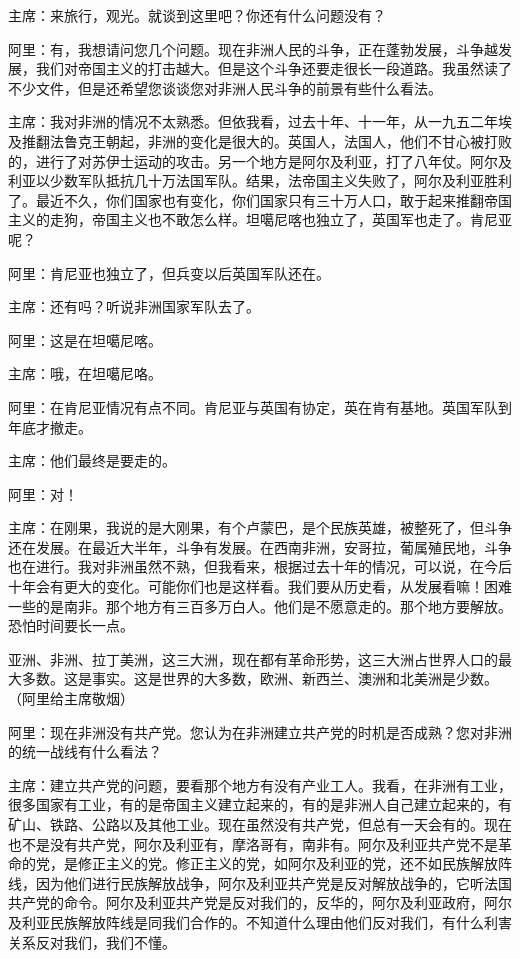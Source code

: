 主席：来旅行，观光。就谈到这里吧？你还有什么问题没有？

阿里：有，我想请问您几个问题。现在非洲人民的斗争，正在蓬勃发展，斗争越发展，我们对帝国主义的打击越大。但是这个斗争还要走很长一段道路。我虽然读了不少文件，但是还希望您谈谈您对非洲人民斗争的前景有些什么看法。

主席：我对非洲的情况不太熟悉。但依我看，过去十年、十一年，从一九五二年埃及推翻法鲁克王朝起，非洲的变化是很大的。英国人，法国人，他们不甘心被打败的，进行了对苏伊士运动的攻击。另一个地方是阿尔及利亚，打了八年仗。阿尔及利亚以少数军队抵抗几十万法国军队。结果，法帝国主义失败了，阿尔及利亚胜利了。最近不久，你们国家也有变化，你们国家只有三十万人口，敢于起来推翻帝国主义的走狗，帝国主义也不敢怎么样。坦噶尼喀也独立了，英国军也走了。肯尼亚呢？

阿里：肯尼亚也独立了，但兵变以后英国军队还在。

主席：还有吗？听说非洲国家军队去了。

阿里：这是在坦噶尼喀。

主席：哦，在坦噶尼咯。

阿里：在肯尼亚情况有点不同。肯尼亚与英国有协定，英在肯有基地。英国军队到年底才撤走。

主席：他们最终是要走的。

阿里：对！

主席：在刚果，我说的是大刚果，有个卢蒙巴，是个民族英雄，被整死了，但斗争还在发展。在最近大半年，斗争有发展。在西南非洲，安哥拉，葡属殖民地，斗争也在进行。我对非洲虽然不熟，但我看来，根据过去十年的情况，可以说，在今后十年会有更大的变化。可能你们也是这样看。我们要从历史看，从发展看嘛！困难一些的是南非。那个地方有三百多万白人。他们是不愿意走的。那个地方要解放。恐怕时间要长一点。

亚洲、非洲、拉丁美洲，这三大洲，现在都有革命形势，这三大洲占世界人口的最大多数。这是事实。这是世界的大多数，欧洲、新西兰、澳洲和北美洲是少数。（阿里给主席敬烟）

阿里：现在非洲没有共产党。您认为在非洲建立共产党的时机是否成熟？您对非洲的统一战线有什么看法？

主席：建立共产党的问题，要看那个地方有没有产业工人。我看，在非洲有工业，很多国家有工业，有的是帝国主义建立起来的，有的是非洲人自己建立起来的，有矿山、铁路、公路以及其他工业。现在虽然没有共产党，但总有一天会有的。现在也不是没有共产党，阿尔及利亚有，摩洛哥有，南非有。阿尔及利亚共产党不是革命的党，是修正主义的党。修正主义的党，如阿尔及利亚的党，还不如民族解放阵线，因为他们进行民族解放战争，阿尔及利亚共产党是反对解放战争的，它听法国共产党的命令。阿尔及利亚共产党是反对我们的，反华的，阿尔及利亚政府，阿尔及利亚民族解放阵线是同我们合作的。不知道什么理由他们反对我们，有什么利害关系反对我们，我们不懂。

